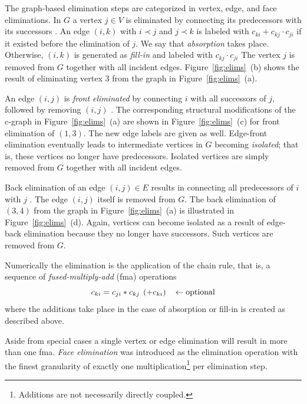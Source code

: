 \documentclass[acmtocl,acmnow]{acmtrans2m}
\newcommand{\reffig}[1]{Figure~\ref{#1}}
\begin{document}
The graph-based elimination steps are categorized in vertex, edge, and face 
eliminations. 
In $G$ a vertex $j \in V$ is eliminated by connecting its predecessors with
its successors \cite{GrRe91}.
An edge $(i,k)$ with
$i \prec j$ and $j \prec k$ is labeled with
$c_{ki}+c_{kj} \cdot c_{ji}$ if it existed before the elimination of $j.$
We say that {\em absorption} takes place.
Otherwise, $(i,k)$ is generated as {\em fill-in} and labeled
with $c_{kj} \cdot c_{ji}$
The vertex $j$ is removed from
$G$ together with all incident edges. 
\reffig{fig:elims}~(b) shows the result of eliminating vertex $3$
from the graph in \reffig{fig:elims}~(a).

An edge $(i,j)$ is {\em front eliminated} by connecting $i$ with all successors
of $j$, followed by removing $(i,j)$ \cite{ElimTechAD2000}.
The corresponding structural modifications of the c-graph in
\reffig{fig:elims}~(a) are shown in
\reffig{fig:elims}~(c) for front elimination of $(1,3).$
The new edge labels are given as well.
Edge-front elimination eventually leads to intermediate vertices in $G$
becoming
{\em isolated}; that is, these vertices no longer have predecessors.
Isolated vertices are simply removed from $G$ together
with all incident edges.

Back elimination of an edge
$(i,j) \in E$ results in connecting all predecessors of $i$
with $j$ \cite{ElimTechAD2000}.
The edge $(i,j)$ itself is removed from $G.$
The back elimination of $(3,4)$ from the graph in \reffig{fig:elims}~(a) 
is illustrated in \reffig{fig:elims}~(d). 
Again, vertices can become isolated as a result of edge-back elimination
because they no longer have successors.
Such vertices are removed from $G.$

Numerically the elimination is the application of 
the chain rule, that is, a sequence of {\em fused-multiply-add} (fma) operations
\begin{equation}\label{eqn:fma}
c_{ki}=c_{ji}*c_{kj}\hspace*{1ex}(+c_{ki}) \hspace*{2ex}\leftarrow \mbox{optional}
\end{equation}
where the additions take place in the case of absorption or fill-in is created 
as described above.

Aside from special cases a single vertex or edge elimination will result in more
than one fma. {\em Face elimination} was introduced 
as the elimination operation with the finest granularity of exactly 
one multiplication\footnote{Additions are not necessarily directly coupled.} 
per elimination step.
\end{document}
